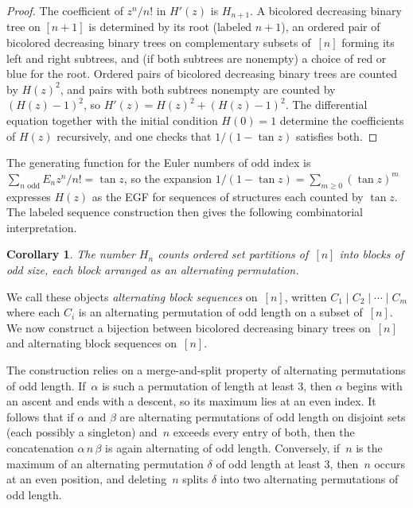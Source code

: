 \documentclass[10pt]{article}
\theoremstyle{plain}
\newtheorem{corollary}[theorem]{Corollary}
\begin{document}
\begin{proof}
The coefficient of $z^n/n!$ in $H'(z)$ is $H_{n+1}$. A bicolored decreasing binary tree on $[n+1]$ is determined by its root (labeled $n+1$), an ordered pair of bicolored decreasing binary trees on complementary subsets of~$[n]$ forming its left and right subtrees, and (if both subtrees are nonempty) a choice of red or blue for the root. Ordered pairs of bicolored decreasing binary trees are counted by $H(z)^2$, and pairs with both subtrees nonempty are counted by $(H(z)-1)^2$, so $H'(z) = H(z)^2 + (H(z)-1)^2$. The differential equation together with the initial condition $H(0) = 1$ determine the coefficients of $H(z)$ recursively, and one checks that $1/(1-\tan z)$ satisfies both.
\end{proof}

The generating function for the Euler numbers of odd index is $\sum_{n \text{ odd}} E_n z^n/n! = \tan z$, so the expansion $1/(1 - \tan z) = \sum_{m \geq 0} (\tan z)^m$ expresses $H(z)$ as the EGF for sequences of structures each counted by $\tan z$. The labeled sequence construction then gives the following combinatorial interpretation.

\begin{corollary}
\label{cor:sequences}
The number $H_n$ counts ordered set partitions of~$[n]$ into blocks of odd size, each block arranged as an alternating permutation.
\end{corollary}

We call these objects \emph{alternating block sequences} on~$[n]$, written $C_1 \mid C_2 \mid \cdots \mid C_m$ where each $C_i$ is an alternating permutation of odd length on a subset of~$[n]$. We now construct a bijection between bicolored decreasing binary trees on~$[n]$ and alternating block sequences on~$[n]$.

The construction relies on a merge-and-split property of alternating permutations of odd length. If~$\alpha$ is such a permutation of length at least $3$, then $\alpha$ begins with an ascent and ends with a descent, so its maximum lies at an even index. It follows that if $\alpha$ and $\beta$ are alternating permutations of odd length on disjoint sets (each possibly a singleton) and~$n$ exceeds every entry of both, then the concatenation $\alpha\, n\, \beta$ is again alternating of odd length. Conversely, if~$n$ is the maximum of an alternating permutation $\delta$ of odd length at least $3$, then~$n$ occurs at an even position, and deleting~$n$ splits $\delta$ into two alternating permutations of odd length.
\end{document}
